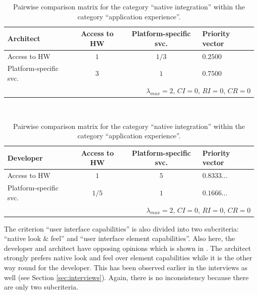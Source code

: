 \begin{table}[h!]
    \centering
    \begin{tabular}{lccl}
        \hline
        \textbf{Architect}     & Access to HW & Platform-specific svc. & Priority vector \\
        \hline
        Access to HW           & $1$          & $1/3$                  & $0.2500$        \\
        Platform-specific svc. & $3$          & $1$                    & $0.7500$        \\
        \hline
        \multicolumn{4}{r}{$\lambda_{max} = 2$, $CI = 0$, $RI = 0$, $CR = 0$}            \\
        \hline
    \end{tabular}
    \\\vspace{1em}
    \begin{tabular}{lccl}
        \hline
        \textbf{Developer}     & Access to HW & Platform-specific svc. & Priority vector \\
        \hline
        Access to HW           & $1$          & $5$                    & $0.8333\ldots$  \\
        Platform-specific svc. & $1/5$        & $1$                    & $0.1666\ldots$  \\
        \hline
        \multicolumn{4}{r}{$\lambda_{max} = 2$, $CI = 0$, $RI = 0$, $CR = 0$}            \\
        \hline
    \end{tabular}
    \caption{Pairwise comparison matrix for the category ``native integration'' within the category ``application experience''.}
    \label{tab:ni}
\end{table}

The criterion ``user interface capabilities'' is also divided into two subcriteria: ``native look \& feel'' and ``user interface element capabilities''. Also here, the developer and architect have opposing opinions which is shown in . The architect strongly prefers native look and feel over element capabilities while it is the other way round for the developer. This has been observed earlier in the interviews as well (see Section \ref{sec:interviews}). Again, there is no inconsistency because there are only two subcriteria.

